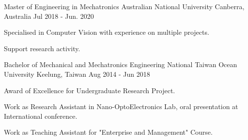

\begin{cventries}

  \cventry
    {Master of Engineering in Mechatronics} %
    {Australian National University} %
    {Canberra, Australia} %
    {Jul 2018 - Jun. 2020} %
    {
      \begin{cvitems} %
        \item {Specialised in Computer Vision with experience on multiple projects.}
        \item {Support research activity.}
      \end{cvitems}
    }
  \cventry
    {Bachelor of Mechanical and Mechatronics Engineering}
    {National Taiwan Ocean University}
    {Keelung, Taiwan}
    {Aug 2014 - Jun 2018}
    {
      \begin{cvitems}
        \item {Award of Excellence for Undergraduate Research Project.}
        \item {Work as Research Assistant in Nano-OptoElectronics Lab, oral presentation at International conference.}
        \item {Work as Teaching Assistant for "Enterprise and Management" Course.}
      \end{cvitems}
    }
\end{cventries}

